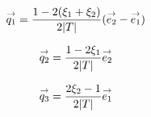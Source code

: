       \begin{minipage}{\textwidth}
        \begin{minipage}{0.329\textwidth}
            \begin{center}
              \begin{tikzpicture}[scale=1]
                
              \end{tikzpicture}
            \end{center}
            \begin{equation*}
              \vect{q_1}=\frac{1-2(\xi_1+\xi_2)}{2|T|}(\vect{e_2}-\vect{e_1})
            \end{equation*}
        \end{minipage}
        \begin{minipage}{0.329\textwidth}
            \begin{center}
              \begin{tikzpicture}[scale=1]
                
              \end{tikzpicture}
               \begin{equation*}
                \vect{q_2}=\frac{1-2\xi_1}{2|T|}\vect{e_2}
              \end{equation*}
            \end{center}
        \end{minipage}
        \begin{minipage}{0.329\textwidth}
            \begin{center}
              \begin{tikzpicture}[scale=1]
                
              \end{tikzpicture}
              \begin{equation*}
                \vect{q_3}=\frac{2\xi_2-1}{2|T|}\vect{e_1}
              \end{equation*}
            \end{center}
        \end{minipage}
        \label{fig:form_int:fon_base:q}
      \end{minipage}

